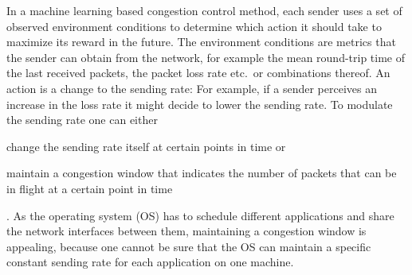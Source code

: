 \documentclass[10pt,sigconf,anonymous]{acmart}
\begin{document}
In a machine learning based congestion control method, each sender uses a set of observed environment conditions to determine which action it should take to maximize its reward in the future. The environment conditions are metrics that the sender can obtain from the network, for example the mean round-trip time of the last received packets, the packet loss rate etc.~or combinations thereof. An action is a change to the sending rate: For example, if a sender perceives an increase in the loss rate it might decide to lower the sending rate. To modulate the sending rate one can  either
\begin{enumerate*}
\item change the sending rate itself at certain points in time or
\item maintain a congestion window that indicates the number of packets that can be in flight at a certain point in time
\end{enumerate*}. As the operating system (OS) has to schedule different applications and share the network interfaces between them, maintaining a congestion window is appealing, because one cannot be sure that the OS can maintain a specific constant sending rate for each application on one machine. 
\end{document}
